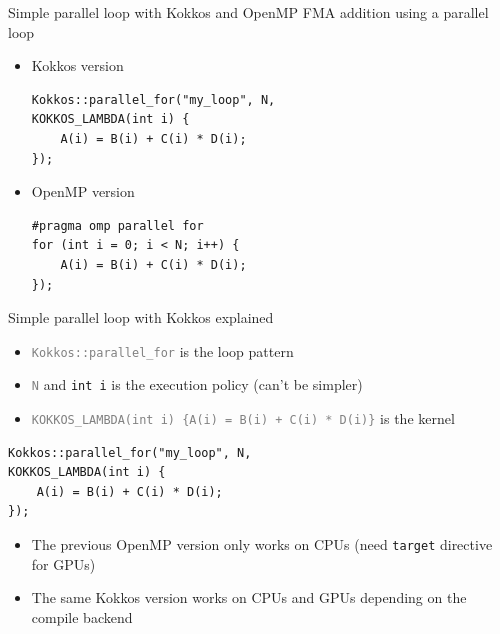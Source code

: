\documentclass[aspectratio=169]{beamer}
\begin{document}
\begin{frame}[fragile]{Simple parallel loop with Kokkos and OpenMP}
    FMA addition using a parallel loop

    \begin{itemize}
        \item Kokkos version
        \begin{verbatim}
Kokkos::parallel_for("my_loop", N,
KOKKOS_LAMBDA(int i) {
    A(i) = B(i) + C(i) * D(i);
});
        \end{verbatim}
        \item OpenMP version
        \begin{verbatim}
#pragma omp parallel for
for (int i = 0; i < N; i++) {
    A(i) = B(i) + C(i) * D(i);
});
        \end{verbatim}
    \end{itemize}
\end{frame}


\begin{frame}[fragile]{Simple parallel loop with Kokkos explained}
    \begin{itemize}
        \item \textcolor{gray}{\texttt{Kokkos::parallel\_for}} is the loop pattern
        \item \textcolor{gray}{\texttt{N}} and \texttt{int i} is the execution policy (can't be simpler)
        \item \textcolor{gray}{\texttt{KOKKOS\_LAMBDA(int i) \{A(i) = B(i) + C(i) * D(i)\}}} is the kernel
    \end{itemize}
    \begin{verbatim}
Kokkos::parallel_for("my_loop", N,
KOKKOS_LAMBDA(int i) {
    A(i) = B(i) + C(i) * D(i);
});
    \end{verbatim}
    \begin{itemize}
        \item The previous OpenMP version only works on CPUs (need \texttt{target} directive for GPUs)
        \item The same Kokkos version works on CPUs and GPUs depending on the compile backend
    \end{itemize}
\end{frame}

\end{document}
